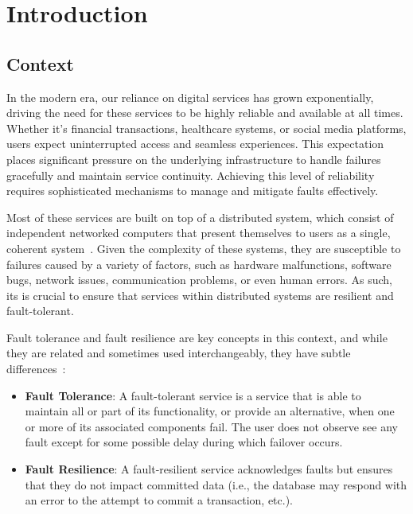 \chapter{Introduction}\label{ch:introduction}


\section{Context}\label{sec:context}

In the modern era, our reliance on digital services has grown exponentially, driving the need for these services to be highly reliable and available at all times. Whether it's financial transactions, healthcare systems, or social media platforms, users expect uninterrupted access and seamless experiences. This expectation places significant pressure on the underlying infrastructure to handle failures gracefully and maintain service continuity. Achieving this level of reliability requires sophisticated mechanisms to manage and mitigate faults effectively.

Most of these services are built on top of a distributed system,
which consist of independent networked computers that present themselves to users as a single,
coherent system~\cite{fcc-distributed-systems}. Given the complexity of these systems, they are susceptible to failures caused by a variety of factors, such as hardware malfunctions, software bugs, network issues, communication problems, or even human errors. As such, its is crucial to ensure that services within distributed systems are resilient and fault-tolerant.

Fault tolerance and fault resilience are key concepts in this context, and while they are related and sometimes used interchangeably, they have subtle differences~\cite{bottomley2004fault}:

\begin{itemize}
    \item {\textbf{Fault Tolerance}}:
    A fault-tolerant service is a service that is able to maintain all or part of its functionality,
    or provide an alternative, when one or more of its associated components fail.
    The user does not observe see any fault except for some possible delay during which failover occurs.
    \item {\textbf{Fault Resilience}}: A fault-resilient service acknowledges faults but ensures that they do not impact committed data (i.e., the database may respond with an error to the attempt to commit a transaction, etc.).
\end{itemize}


